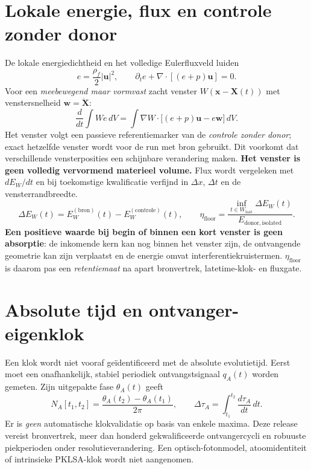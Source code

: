 \documentclass[10pt,a4paper]{article}
\newcommand{\rhoF}{\rho_{\!f}}\newcommand{\rc}{r_c}\newcommand{\vswirl}{\mathbf{v}_{\!\boldsymbol{\circlearrowleft}}}
\begin{document}
\section{Lokale energie, flux en controle zonder donor}
De lokale energiedichtheid en het volledige Eulerfluxveld luiden
\begin{equation}
 e=\frac{\rhoF}{2}|\mathbf{u}|^2,\qquad
\partial_t e+\nabla\cdot[(e+p)\mathbf{u}]=0.
\end{equation}
Voor een \emph{meebewegend maar vormvast} zacht venster $W(\mathbf{x}-\mathbf{X}(t))$ met venstersnelheid $\mathbf w=\dot{\mathbf X}$:
\begin{equation}
\boxed{\frac{d}{dt}\int W e\,dV=\int\nabla W\cdot\bigl[(e+p)\mathbf{u}-e\mathbf{w}\bigr]\,dV.}
\end{equation}
Het venster volgt een passieve referentiemarker van de \emph{controle zonder donor}; exact hetzelfde venster wordt voor de run met bron gebruikt. Dit voorkomt dat verschillende vensterposities een schijnbare verandering maken. \textbf{Het venster is geen volledig vervormend materieel volume.} Flux wordt vergeleken met $dE_W/dt$ en bij toekomstige kwalificatie verfijnd in $\Delta x$, $\Delta t$ en de vensterrandbreedte.
\begin{equation}
\Delta E_W(t)=E_W^{(\mathrm{bron})}(t)-E_W^{(\mathrm{controle})}(t),\qquad
\eta_{\mathrm{floor}}=\frac{\inf_{t\in W_{\mathrm{laat}}}\Delta E_W(t)}{E_{\mathrm{donor,isolated}}}.
\end{equation}
\textbf{Een positieve waarde bij begin of binnen een kort venster is geen absorptie}: de inkomende kern kan nog binnen het venster zijn, de ontvangende geometrie kan zijn verplaatst en de energie omvat interferentiekruistermen. $\eta_{\mathrm{floor}}$ is daarom pas een \emph{retentiemaat} na apart bronvertrek, latetime-klok- en fluxgate.
\section{Absolute tijd en ontvanger-eigenklok}
Een klok wordt niet vooraf ge\"identificeerd met de absolute evolutietijd. Eerst moet een onafhankelijk, stabiel periodiek ontvangstsignaal $q_A(t)$ worden gemeten. Zijn uitgepakte fase $\theta_A(t)$ geeft
\begin{equation}
 N_A[t_1,t_2]=\frac{\theta_A(t_2)-\theta_A(t_1)}{2\pi},\qquad
 \Delta\tau_A=\int_{t_1}^{t_2}\frac{d\tau_A}{dt}\,dt.
\end{equation}
Er is \emph{geen} automatische klokvalidatie op basis van enkele maxima. Deze release vereist bronvertrek, meer dan honderd gekwalificeerde ontvangercycli en robuuste piekperioden onder resolutieverandering. Een optisch-fotonmodel, atoomidentiteit of intrinsieke PKLSA-klok wordt niet aangenomen.
\end{document}
